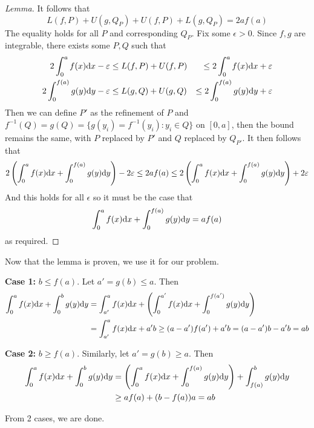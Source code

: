 \documentclass[a4paper, 12pt]{article}
\begin{document}
\begin{solution}
\begin{proof} [Lemma]
        It follows that \begin{equation*}
            L(f, P) + U(g, Q_P) + U(f, P) + L(g, Q_P) = 2af(a)
        \end{equation*}
        The equality holds for all $P$ and corresponding $Q_P$. Fix some $\epsilon > 0$. Since $f, g$ are integrable, there exists some $P, Q$ such that
        \begin{align*}
             2\int_{0}^{a} f(x) \mathrm{d} x - \varepsilon &\leq L(f, P) + U(f, P) &\leq 2\int_{0}^{a} f(x) \mathrm{d} x + \varepsilon \\
            2\int_{0}^{f(a)} g(y) \mathrm{d} y - \varepsilon &\leq L(g, Q) + U(g, Q) &\leq 2\int_{0}^{f(a)} g(y) \mathrm{d} y + \varepsilon
        \end{align*}
        Then we can define $P'$ as the refinement of $P$ and $f^{-1}(Q) = g(Q) = \{g(y_i) = f^{-1}(y_i) : y_i \in Q\}$ on $[0, a]$, then the bound remains the same, with $P$ replaced by $P'$ and $Q$ replaced by $Q_{P'}$. It then follows that \begin{equation*}
            2 \left(\int_{0}^{a} f(x) \mathrm{d} x + \int_{0}^{f(a)} g(y) \mathrm{d} y\right) - 2\varepsilon \leq 2a f(a) \leq  2 \left(\int_{0}^{a} f(x) \mathrm{d} x + \int_{0}^{f(a)} g(y) \mathrm{d} y\right) + 2\varepsilon
        \end{equation*}
        And this holds for all $\epsilon$ so it must be the case that \begin{equation*}
            \int_{0}^{a} f(x) \mathrm{d} x + \int_{0}^{f(a)} g(y) \mathrm{d} y = af(a)
        \end{equation*}
        as required.
    \end{proof}

    Now that the lemma is proven, we use it for our problem.

    \textbf{Case 1:} $b \leq f(a)$. Let $a' = g(b) \leq a$. Then
    \begin{align*}
        \int_{0}^{a} f(x) \mathrm{d} x + \int_{0}^{b} g(y) \mathrm{d} y &= \int_{a'}^{a} f(x) \mathrm{d} x + \left(\int_{0}^{a'} f(x) \mathrm{d} x + \int_{0}^{f(a')} g(y) \mathrm{d} y\right) \\
        &= \int_{a'}^{a} f(x) \mathrm{d} x + a'b \geq (a - a') f(a') + a'b = (a - a')b - a'b = ab
    \end{align*}

    \textbf{Case 2:} $b \geq f(a)$. Similarly, let $a' = g(b) \geq a$. Then
    \begin{align*}
        \int_{0}^{a} f(x) \mathrm{d} x + \int_{0}^{b} g(y) \mathrm{d} y &= \left(\int_{0}^{a} f(x) \mathrm{d} x + \int_{0}^{f(a)} g(y) \mathrm{d} y \right) + \int_{f(a)}^{b} g(y) \mathrm{d} y \\
        &\geq af(a) + (b - f(a)) a = ab
    \end{align*}

    From 2 cases, we are done.
\end{solution}
\end{document}

